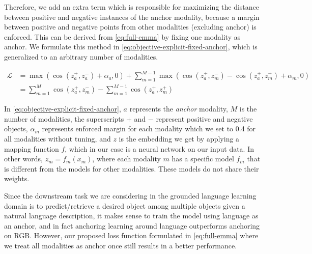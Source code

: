 Therefore, we add an extra term which is responsible for maximizing the distance between positive and negative instances of the anchor modality, because a margin between positive and negative points from other modalities (excluding anchor) is enforced. This can be derived from \cref{eq:full-emma} by fixing one modality as anchor.
We formulate this method in \cref{eq:objective-explicit-fixed-anchor}, which is generalized to an arbitrary number of modalities.

\begin{equation}
\label{eq:objective-explicit-fixed-anchor}
\begin{split}
    \mathcal{L}  %
    &= \max(\cos(z_{a}^{+}, z_{a}^{-}) + \alpha_a, 0) + \sum_{m=1}^{M-1} \max \left(\cos(z_{a}^{+} ,z_{m}^{-}) - \cos(z_{a}^{+}, z_{m}^{+}) + \alpha_m, 0 \right) \\  
    &= \sum_{m=1}^{M}  \cos(z_{a}^{+} ,z_{m}^{-}) - \sum_{m=1}^{M-1} \cos(z_{a}^{+}, z_{m}^{+})
\end{split}
\end{equation}


In \cref{eq:objective-explicit-fixed-anchor}, $a$ represents the \textit{anchor} modality, $M$ is the number of modalities, the superscripts $+$ and $-$ represent positive and negative objects, $\alpha_m$ represents enforced margin for each modality which we set to 0.4 for all modalities without tuning, and $z$ is the embedding we get by applying a mapping function $f$, which in our case is a neural network on our input data.
In other words, $z_m = f_m(x_m)$, where each modality $m$ has a specific model $f_m$ that is different from the models for other modalities. These models do not share their weights.

Since the downstream task we are considering in the grounded language learning domain is to predict/retrieve a desired object among multiple objects given a natural language description, it makes sense to train the model using language as an anchor, and in fact anchoring learning around language outperforms anchoring on RGB. However, our proposed \geom{} loss function formulated in \cref{eq:full-emma} where we treat all modalities as anchor once still results in a better performance.


